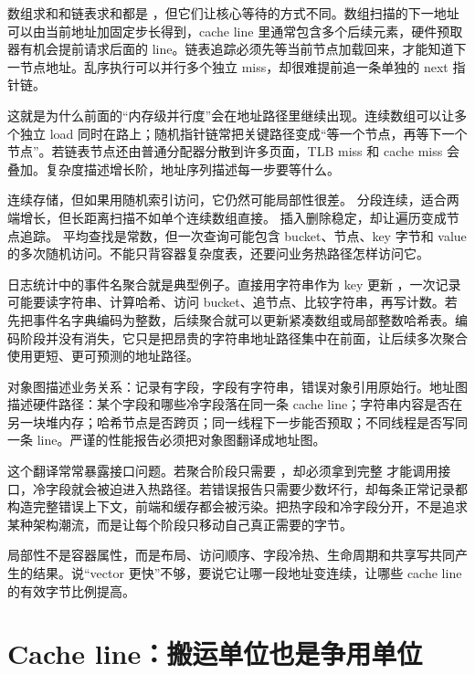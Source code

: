 数组求和和链表求和都是 ，但它们让核心等待的方式不同。数组扫描的下一地址可以由当前地址加固定步长得到，cache line 里通常包含多个后续元素，硬件预取器有机会提前请求后面的 line。链表追踪必须先等当前节点加载回来，才能知道下一节点地址。乱序执行可以并行多个独立 miss，却很难提前追一条单独的 next 指针链。

这就是为什么前面的“内存级并行度”会在地址路径里继续出现。连续数组可以让多个独立 load 同时在路上；随机指针链常把关键路径变成“等一个节点，再等下一个节点”。若链表节点还由普通分配器分散到许多页面，TLB miss 和 cache miss 会叠加。复杂度描述增长阶，地址序列描述每一步要等什么。

 连续存储，但如果用随机索引访问，它仍然可能局部性很差。 分段连续，适合两端增长，但长距离扫描不如单个连续数组直接。 插入删除稳定，却让遍历变成节点追踪。 平均查找是常数，但一次查询可能包含 bucket、节点、key 字节和 value 的多次随机访问。不能只背容器复杂度表，还要问业务热路径怎样访问它。

日志统计中的事件名聚合就是典型例子。直接用字符串作为 key 更新 ，一次记录可能要读字符串、计算哈希、访问 bucket、追节点、比较字符串，再写计数。若先把事件名字典编码为整数，后续聚合就可以更新紧凑数组或局部整数哈希表。编码阶段并没有消失，它只是把昂贵的字符串地址路径集中在前面，让后续多次聚合使用更短、更可预测的地址路径。

对象图描述业务关系：记录有字段，字段有字符串，错误对象引用原始行。地址图描述硬件路径：某个字段和哪些冷字段落在同一条 cache line；字符串内容是否在另一块堆内存；哈希节点是否跨页；同一线程下一步能否预取；不同线程是否写同一条 line。严谨的性能报告必须把对象图翻译成地址图。

这个翻译常常暴露接口问题。若聚合阶段只需要 ，却必须拿到完整  才能调用接口，冷字段就会被迫进入热路径。若错误报告只需要少数坏行，却每条正常记录都构造完整错误上下文，前端和缓存都会被污染。把热字段和冷字段分开，不是追求某种架构潮流，而是让每个阶段只移动自己真正需要的字节。

\begin{keyidea}
局部性不是容器属性，而是布局、访问顺序、字段冷热、生命周期和共享写共同产生的结果。说“vector 更快”不够，要说它让哪一段地址变连续，让哪些 cache line 的有效字节比例提高。
\end{keyidea}

\section{Cache line：搬运单位也是争用单位}

